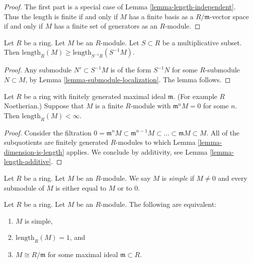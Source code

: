\begin{proof}
The first part is a special case of Lemma \ref{lemma-length-independent}.
Thus the length is finite if and only if $M$ has a finite basis
as a $R/\mathfrak m$-vector space if and only if $M$ has a finite
set of generators as an $R$-module.
\end{proof}

\begin{lemma}
\label{lemma-length-localize}
Let $R$ be a ring. Let $M$ be an $R$-module. Let $S \subset R$ be
a multiplicative subset. Then
$\text{length}_R(M) \geq \text{length}_{S^{-1}R}(S^{-1}M)$.
\end{lemma}

\begin{proof}
Any submodule $N' \subset S^{-1}M$ is of the form
$S^{-1}N$ for some $R$-submodule $N \subset M$, by Lemma
\ref{lemma-submodule-localization}. The lemma follows.
\end{proof}

\begin{lemma}
\label{lemma-length-finite}
Let $R$ be a ring with finitely generated
maximal ideal $\mathfrak m$. (For example $R$ Noetherian.)
Suppose that $M$ is a finite $R$-module with
$\mathfrak m^n M  =  0$ for some $n$.
Then $\text{length}_R(M) < \infty$.
\end{lemma}

\begin{proof}
Consider the filtration
$0 = \mathfrak m^n M \subset
\mathfrak m^{n-1} M \subset
\ldots \subset \mathfrak m M \subset M$.
All of the subquotients are finitely generated $R$-modules
to which Lemma \ref{lemma-dimension-is-length} applies. We conclude
by additivity, see Lemma \ref{lemma-length-additive}.
\end{proof}

\begin{definition}
\label{definition-simple-module}
Let $R$ be a ring. Let $M$ be an $R$-module.
We say $M$ is {\it simple} if $M \not = 0$ and
every submodule of $M$ is either equal to $M$ or
to $0$.
\end{definition}

\begin{lemma}
\label{lemma-characterize-length-1}
Let $R$ be a ring. Let $M$ be an $R$-module.
The following are equivalent:
\begin{enumerate}
\item $M$ is simple,
\item $\text{length}_R(M) = 1$, and
\item $M \cong R/\mathfrak m$ for some maximal ideal
$\mathfrak m \subset R$.
\end{enumerate}
\end{lemma}

